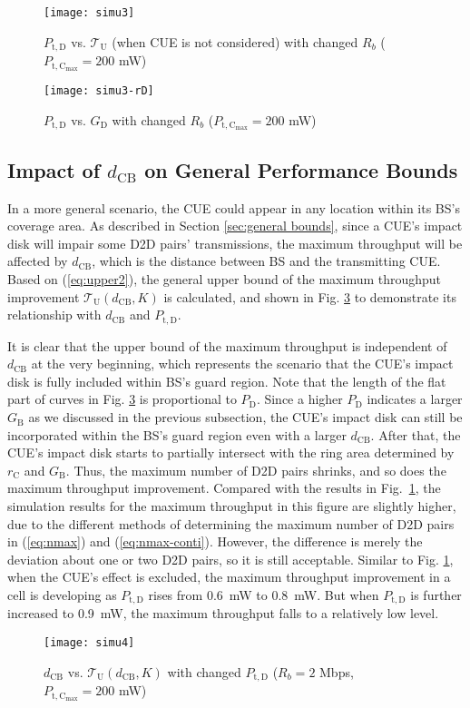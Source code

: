 \documentclass[journal, 10pt]{IEEEtran}
\begin{document}
\begin{figure}[!htb]
\centering \texttt{[image: simu3]} \caption{$P_\mathrm{t,D}$ vs. $\mathcal{T}_\mathrm{U}$ 
(when CUE is not considered) with changed $R_b$  
($P_\mathrm{t,C_{max} } =200$ mW)} \label{fig:sim2}
\end{figure}
\begin{figure}[!htb]
\centering \texttt{[image: simu3-rD]} \caption{$P_\mathrm{t,D}$ vs. $G_\mathrm{D}$ with changed $R_b$ 
($P_\mathrm{t,C_{max} } =200$ mW)} \label{fig:sim2-rD}
\end{figure}

\subsection{Impact of $d_\mathrm{CB}$ on General Performance Bounds}
\label{sec:simu-c}
In a more general scenario, the CUE could appear in any location
within its BS's coverage area. As described in Section
\ref{sec:general bounds}, since a CUE's impact disk will impair some
D2D pairs' transmissions, the maximum throughput will be affected by
$d_\mathrm{CB}$, which is the distance between BS and the
transmitting CUE. Based on (\ref{eq:upper2}), the general upper bound
of the maximum throughput improvement $\mathcal{T}_\mathrm{U}
\left(d_\mathrm{CB}, K\right)$ is calculated, and shown in Fig.
\ref{fig:sim4} to demonstrate its relationship with $d_\mathrm{CB}$
and $P_\mathrm{t, D}$. 

It is clear that the upper bound of the maximum throughput is
independent of $d_\mathrm{CB}$ at the very beginning, which
represents the scenario that the CUE's impact disk is fully included
within BS's guard region. Note that the length of the flat part of
curves in Fig. \ref{fig:sim4} is proportional to $P_\mathrm{D}$. Since
a higher $P_\mathrm{D}$ indicates a larger $G_\mathrm{B}$ as we
discussed in the previous subsection, the CUE's impact disk can
still be incorporated within the BS's guard region even with a larger
$d_\mathrm{CB}$. After that, the CUE's impact disk starts to
partially intersect with the ring area determined by $r_\mathrm{C}$
and $G_\mathrm{B}$. Thus, the maximum number of D2D pairs shrinks, and
so does the maximum throughput improvement. Compared with the results
in Fig.~\ref{fig:sim2}, the simulation results for the maximum
throughput in this figure are slightly higher, due to the different
methods of determining the maximum number of D2D pairs in
(\ref{eq:nmax}) and (\ref{eq:nmax-conti}). However, the difference is
merely the deviation about one or two D2D pairs, so it is still
acceptable. 
Similar to Fig. \ref{fig:sim2}, when the CUE's effect is excluded, the
maximum throughput improvement in a cell is developing as
$P_\mathrm{t, D}$ rises from 0.6~mW to 0.8~mW. But when $P_\mathrm{t,
D}$ is further increased to 0.9~mW, the maximum throughput falls to a
relatively low level.  
\begin{figure}[!htb]
\centering \texttt{[image: simu4]} \caption{$d_\mathrm{CB}$ vs. $\mathcal{T}_\mathrm{U} \left(d_\mathrm{CB}, 
K\right)$ with changed $P_\mathrm{t, D}$ ($R_b = 2$ Mbps, 
$P_\mathrm{t,C_{max}} = 200$ mW)} \label{fig:sim4}
\end{figure}
\end{document}
